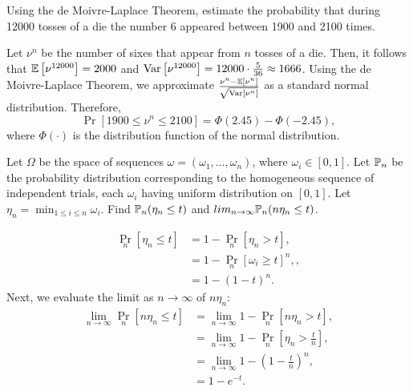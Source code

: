 \begin{problem}{5}
    Using the de Moivre-Laplace Theorem, estimate the probability that during 12000 tosses of a die the number 6 appeared between 1900 and 2100 times.
\end{problem}
\begin{solution}
    Let $\nu^n$ be the number of sixes that appear from $n$ tosses of a die. Then, it follows that $\mathbb{E}\left[\nu^{12000}\right] = 2000$ and $\operatorname{Var}\left[{\nu^{12000}}\right] = 12000\cdot\frac{5}{36} \approx 1666$. Using the de Moivre-Laplace Theorem, we approximate $\frac{\nu^n - \mathbb{E}\left[\nu^n\right]}{\sqrt{\operatorname{Var}[\nu^n]}}$ as a standard normal distribution. Therefore,
    \[\Pr[1900 \leq \nu^n \leq 2100] = \Phi(2.45) - \Phi(-2.45),\]
    where $\Phi(\cdot)$ is the distribution function of the normal distribution.
\end{solution}
\begin{problem}{6}
    Let $\Omega$ be the space of sequences $\omega = (\omega_1,\ldots,\omega_n)$, where $\omega_i \in [0,1]$. Let $\mathbb{P}_n$ be the probability distribution corresponding to the homogeneous sequence of independent trials, each $\omega_i$ having uniform distribution on $[0,1]$. Let $\eta_n = \min_{1\leq i\leq n} \omega_i$. Find $\mathbb{P}_n(\eta_n \leq t)$ and $lim_{n\to\infty} \mathbb{P}_n(n\eta_n \leq t)$.
\end{problem}
\begin{solution}
    \begin{align*}
        \Pr_n[\eta_n \leq t] &= 1 - \Pr_n[\eta_n > t], \\
        &= 1 - \Pr_n[\omega_i \geq t]^n, \tag{by i.i.d.}, \\
        &= 1 - (1-t)^n.
    \end{align*}
    Next, we evaluate the limit as $n\to\infty$ of $n\eta_n$:
    \begin{align*}
        \lim_{n\to\infty} \Pr_n[n\eta_n \leq t] &= \lim_{n\to\infty} 1 - \Pr_n[n\eta_n > t], \\
        &= \lim_{n\to\infty} 1 - \Pr_n\left[\eta_n > \frac{t}{n}\right], \\
        &= \lim_{n\to\infty} 1 - \left(1 - \frac{t}{n}\right)^n, \\
        &= 1-e^{-t}.
    \end{align*}
\end{solution}
\begin{problem}{7}
    
\end{problem}
\begin{solution}
    
\end{solution}
\begin{problem}{8}
\end{problem}
\begin{solution}
\end{solution}

